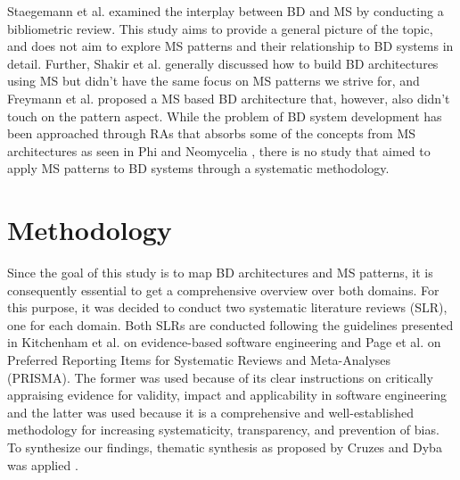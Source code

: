 \documentclass{bmcart}
\begin{document}
Staegemann et al. \cite{staegemann2021examining} examined the interplay between BD and MS by conducting a bibliometric review. This study aims to provide a general picture of the topic, and does not aim to explore MS patterns and their relationship to BD systems in detail. Further, Shakir et al. \cite{shakir2021towards} generally discussed how to build BD architectures using MS but didn't have the same focus on MS patterns we strive for, and Freymann et al. \cite{freymann2020tackling} proposed a MS based BD architecture that, however, also didn't touch on the pattern aspect. While the problem of BD system development has been approached through RAs that absorbs some of the concepts from MS architectures as seen in Phi \cite{Phi} and Neomycelia \cite{ataei2021neomycelia}, there is no study that aimed to apply MS patterns to BD systems through a systematic methodology.


\section{Methodology} 

Since the goal of this study is to map BD architectures and MS patterns, it is consequently essential to get a comprehensive overview over both domains. For this purpose, it was decided to conduct two systematic literature reviews (SLR), one for each domain. Both SLRs are conducted following the guidelines presented in Kitchenham et al. \cite{Kitchenham.2004} on evidence-based software engineering and Page et al. \cite{Page.2021} on Preferred Reporting Items for Systematic Reviews and Meta-Analyses (PRISMA). The former was used because of its clear instructions on critically appraising evidence for validity, impact and applicability in software engineering and the latter was used because it is a comprehensive and well-established methodology for increasing systematicity, transparency, and prevention of bias. To synthesize our findings, thematic synthesis as proposed by Cruzes and Dyba was applied \cite{Cruzes.2011}. 


\end{document}
